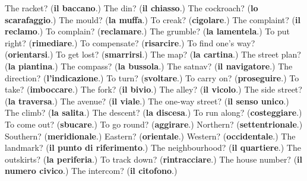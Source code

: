 \begin{tcolorbox}[breakable,colback=teal!4,colframe=teal!35!black,title={Before you move on}]
The racket? (\textbf{il baccano}.) The din? (\textbf{il chiasso}.) The cockroach? (\textbf{lo scarafaggio}.) The mould? (\textbf{la muffa}.) To creak? (\textbf{cigolare}.) The complaint? (\textbf{il reclamo}.) To complain? (\textbf{reclamare}.) The grumble? (\textbf{la lamentela}.) To put right? (\textbf{rimediare}.) To compensate? (\textbf{risarcire}.) To find one's way? (\textbf{orientarsi}.) To get lost? (\textbf{smarrirsi}.) The map? (\textbf{la cartina}.) The street plan? (\textbf{la piantina}.) The compass? (\textbf{la bussola}.) The satnav? (\textbf{il navigatore}.) The direction? (\textbf{l'indicazione}.) To turn? (\textbf{svoltare}.) To carry on? (\textbf{proseguire}.) To take? (\textbf{imboccare}.) The fork? (\textbf{il bivio}.) The alley? (\textbf{il vicolo}.) The side street? (\textbf{la traversa}.) The avenue? (\textbf{il viale}.) The one-way street? (\textbf{il senso unico}.) The climb? (\textbf{la salita}.) The descent? (\textbf{la discesa}.) To run along? (\textbf{costeggiare}.) To come out? (\textbf{sbucare}.) To go round? (\textbf{aggirare}.) Northern? (\textbf{settentrionale}.) Southern? (\textbf{meridionale}.) Eastern? (\textbf{orientale}.) Western? (\textbf{occidentale}.) The landmark? (\textbf{il punto di riferimento}.) The neighbourhood? (\textbf{il quartiere}.) The outskirts? (\textbf{la periferia}.) To track down? (\textbf{rintracciare}.) The house number? (\textbf{il numero civico}.) The intercom? (\textbf{il citofono}.)
\end{tcolorbox}
